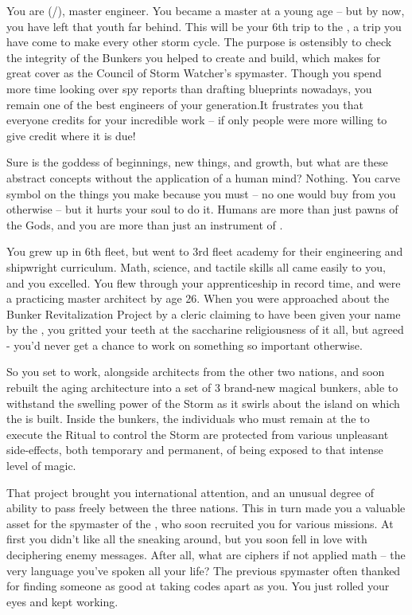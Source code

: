 \documentclass[char]{GL2020}
\begin{document}
\name{\cBunker{}}

You are \cBunker{\full} (\cBunker{\they}/\cBunker{\them}), master engineer. You became a master at a young age -- but by now, you have left that youth far behind. This will be your 6th trip to the \pSchool{}, a trip you have come to make every other storm cycle. The purpose is ostensibly to check the integrity of the Bunkers you helped to create and build, which makes for great cover as the Council of Storm Watcher’s spymaster. Though you spend more time looking over spy reports than drafting blueprints nowadays, you remain one of the best engineers of your generation.It frustrates you that everyone credits \cFlow{} for your incredible work -- if only people were more willing to give credit where it is due!

Sure \cFlow{} is the goddess of beginnings, new things, and growth, but what are these abstract concepts without the application of a human mind? Nothing. You carve \cFlow{\their} symbol on the things you make because you must -- no one would buy from you otherwise -- but it hurts your soul to do it. Humans are more than just pawns of the Gods, and you are more than just an instrument of \cFlow{}.

You grew up in 6th fleet, but went to 3rd fleet academy for their engineering and shipwright curriculum. Math, science, and tactile skills all came easily to you, and you excelled. You flew through your apprenticeship in record time, and were a practicing master architect by age 26. When you were approached about the Bunker Revitalization Project by a \cFlow{} cleric claiming to have been given your name by the \cFlow{\God} \cFlow{\themself}, you gritted your teeth at the saccharine religiousness of it all, but agreed - you’d never get a chance to work on something so important otherwise. 

So you set to work, alongside architects from the other two nations, and soon rebuilt the aging architecture into a set of 3 brand-new magical bunkers, able to withstand the swelling power of the Storm as it swirls about the island on which the \pSchool{} is built. Inside the bunkers, the individuals who must remain at the \pSc{} to execute the Ritual to control the Storm are protected from various unpleasant side-effects, both temporary and permanent, of being exposed to that intense level of magic.

That project brought you international attention, and an unusual degree of ability to pass freely between the three nations. This in turn made you a valuable asset for the spymaster of the \pShip{}, who soon recruited you for various missions. At first you didn’t like all the sneaking around, but you soon fell in love with deciphering enemy messages. After all, what are ciphers if not applied math -- the very language you’ve spoken all your life? The previous spymaster often thanked \cEbb{} for finding someone as good at taking codes apart as you. You just rolled your eyes and kept working.
\end{document}
